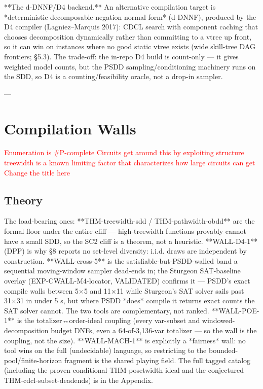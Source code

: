 \documentclass[letterpaper]{article} %
\newcommand{\todo}[1]{\textcolor{red}{#1}}
\begin{document}
**The d-DNNF/D4 backend.** An alternative compilation target is *deterministic decomposable negation
normal form* (d-DNNF), produced by the D4 compiler (Lagniez–Marquis 2017): CDCL search with
component caching that chooses decomposition dynamically rather than committing to a vtree up front,
so it can win on instances where no good static vtree exists (wide skill-tree DAG frontiers; §5.3).
The trade-off: the in-repo D4 build is count-only — it gives weighted model counts, but the PSDD
sampling/conditioning machinery runs on the SDD, so D4 is a counting/feasibility oracle, not a
drop-in sampler.

---


\section{Compilation Walls}
\todo{Enumeration is #P-complete}
\todo{Circuits get around this by exploiting structure}
\todo{treewidth is a known limiting factor that characterizes how large circuits can get}
\todo{Change the title here}


\subsection{Theory}
The load-bearing ones: **THM-treewidth-sdd / THM-pathwidth-obdd** are the formal floor under the
entire cliff — high-treewidth functions provably cannot have a small SDD, so the SC2 cliff is a
theorem, not a heuristic. **WALL-D4-1** (DPP) is why §8 reports no set-level diversity: i.i.d. draws
are independent by construction. **WALL-cross-5** is the satisfiable-but-PSDD-walled band a sequential
moving-window sampler dead-ends in; the Sturgeon SAT-baseline overlay (EXP-CWALL-M4-locator,
VALIDATED) confirms it — PSDD's exact compile walls between 5×5 and 11×11 while Sturgeon's SAT solver
sails past 31×31 in under 5 s, but where PSDD *does* compile it returns exact counts the SAT solver
cannot. The two tools are complementary, not ranked. **WALL-POE-1** is the totalizer↔order-ideal
coupling (every var-subset and windowed-decomposition budget DNFs, even a 64-of-3,136-var totalizer —
so the wall is the coupling, not the size). **WALL-MACH-1** is explicitly a *fairness* wall: no tool
wins on the full (undecidable) language, so restricting to the bounded-pool/finite-horizon fragment
is the shared playing field. The full tagged catalog (including the proven-conditional
THM-posetwidth-ideal and the conjectured THM-cdcl-subset-deadends) is in the Appendix.
\end{document}
